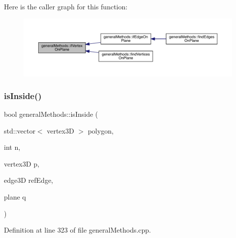 Here is the caller graph for this function\+:
\nopagebreak
\begin{figure}[H]
\begin{center}
\leavevmode
\includegraphics[width=350pt]{namespacegeneral_methods_a330682bb45234d8de5228a7607d493d2_icgraph}
\end{center}
\end{figure}
\mbox{\label{namespacegeneral_methods_a27b7ed292415027c495942147e8856b7}} 
\subsubsection{\texorpdfstring{is\+Inside()}{isInside()}}
{\footnotesize\ttfamily bool general\+Methods\+::is\+Inside (\begin{DoxyParamCaption}\item[{std\+::vector$<$ vertex3D $>$}]{polygon,  }\item[{int}]{n,  }\item[{vertex3D}]{p,  }\item[{edge3D}]{ref\+Edge,  }\item[{plane}]{q }\end{DoxyParamCaption})}



Definition at line 323 of file general\+Methods.\+cpp.

